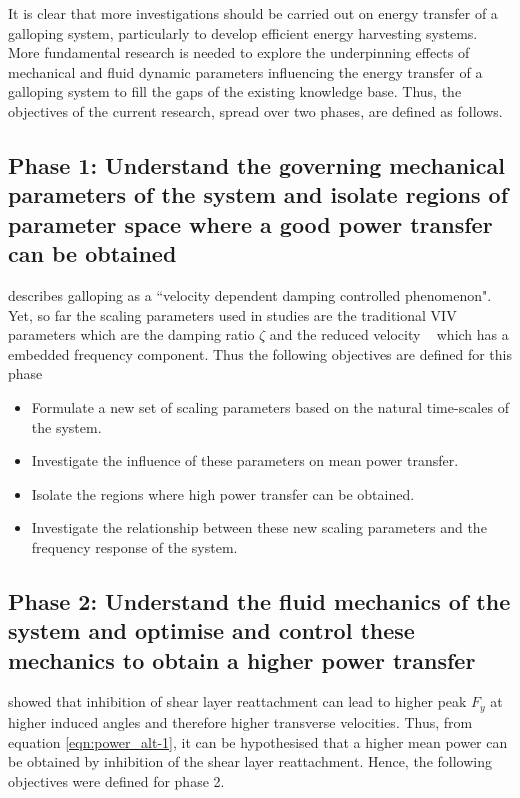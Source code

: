  It is clear that more investigations should be carried out on energy transfer of a galloping system, particularly to develop efficient energy harvesting systems. More fundamental research is needed to explore the underpinning effects of mechanical and fluid dynamic parameters influencing the energy transfer of a galloping system to fill the gaps of the existing knowledge base. Thus, the objectives of the current research, spread over two phases, are defined as follows.
 
 \subsection*{Phase 1: Understand the governing mechanical parameters of the system and isolate regions of parameter space where a good power transfer can be obtained}
 
 \citet{Paidoussis2010} describes galloping as a ``velocity dependent damping controlled phenomenon". Yet, so far the scaling parameters used in studies are the traditional VIV parameters which are the damping ratio $\zeta$ and the reduced velocity \ustar\ \citep{Barrero-Gil2010a} which has a embedded frequency component. Thus the following objectives are defined for this phase 
 
 \begin{itemize}
\item Formulate a new set of scaling parameters based on the natural time-scales of the system.
\item Investigate the influence of these parameters on mean power transfer.
\item Isolate the regions where high power transfer can be obtained.
\item Investigate the relationship between these new scaling parameters and the frequency response of the system. 
 \end{itemize}
 
    
  \subsection*{Phase 2: Understand the fluid mechanics of the system and optimise and control these mechanics to obtain a higher power transfer}
  
  \citet{Luo1994} showed that inhibition of shear layer reattachment can lead to higher peak $F_{y}$ at higher induced angles and therefore higher transverse velocities. Thus, from equation \ref{eqn:power_alt-1}, it can be hypothesised that a higher mean power can be obtained by inhibition of the shear layer reattachment. Hence, the following objectives were defined for phase 2. 
  
